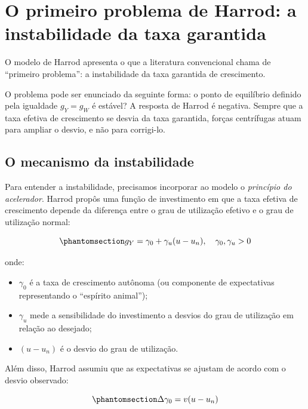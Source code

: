 \documentclass[
  brazilian,
  letterpaper,
  DIV=11,
  numbers=noendperiod]{scrreprt}
\providecommand{\tightlist}{%
  \setlength{\itemsep}{0pt}\setlength{\parskip}{0pt}}
\begin{document}
\section{O primeiro problema de Harrod: a instabilidade da taxa
garantida}\label{sec-primeiro-problema-harrod}

O modelo de Harrod apresenta o que a literatura convencional chama de
``primeiro problema'': a instabilidade da taxa garantida de crescimento.

O problema pode ser enunciado da seguinte forma: o ponto de equilíbrio
definido pela igualdade \(g_Y = g_W\) é estável? A resposta de Harrod é
negativa. Sempre que a taxa efetiva de crescimento se desvia da taxa
garantida, forças centrífugas atuam para ampliar o desvio, e não para
corrigi-lo.

\subsection{O mecanismo da
instabilidade}\label{o-mecanismo-da-instabilidade}

Para entender a instabilidade, precisamos incorporar ao modelo o
\emph{princípio do acelerador}. Harrod propôs uma função de investimento
em que a taxa efetiva de crescimento depende da diferença entre o grau
de utilização efetivo e o grau de utilização normal:

\begin{equation}\protect\phantomsection\label{eq-acelerador-harrod}{g_Y = \gamma_0 + \gamma_u (u - u_n), \quad \gamma_0, \gamma_u > 0}\end{equation}

onde:

\begin{itemize}
\tightlist
\item
  \(\gamma_0\) é a taxa de crescimento autônoma (ou componente de
  expectativas representando o ``espírito animal'');
\item
  \(\gamma_u\) mede a sensibilidade do investimento a desvios do grau de
  utilização em relação ao desejado;
\item
  \((u - u_n)\) é o desvio do grau de utilização.
\end{itemize}

Além disso, Harrod assumiu que as expectativas se ajustam de acordo com
o desvio observado:

\begin{equation}\protect\phantomsection\label{eq-ajuste-expectativas}{\Delta \gamma_0 = v (u - u_n)}\end{equation}
\end{document}
